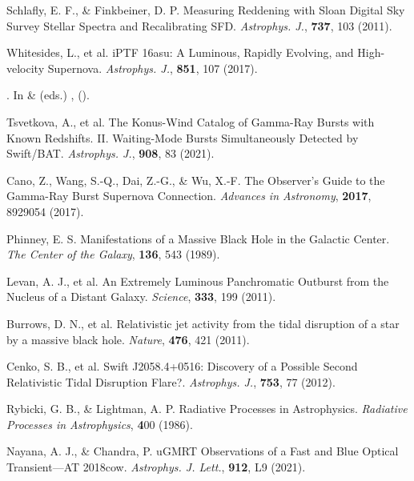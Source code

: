 \documentclass{nature_plusfigure}
\newcommand{\apj}{{Astrophys. J.}}
\newcommand{\apjl}{{Astrophys. J. Lett.}}
\newcommand{\nat}{{Nature}}
\begin{document}
\begin{methods}
\begin{thebibliography}{10}
  Schlafly, E. F., \& Finkbeiner, D. P. Measuring Reddening with Sloan Digital Sky Survey Stellar Spectra and Recalibrating SFD. \emph{\apj}, \textbf{737}, 103 (2011). 
 
  Whitesides, L., et al. iPTF 16asu: A Luminous, Rapidly Evolving, and High-velocity Supernova. \emph{\apj}, \textbf{851}, 107 (2017). 

\newblock {}.
\newblock In  \&  (eds.) \emph{},
   ().
 

 Tsvetkova, A., et al. The Konus-Wind Catalog of Gamma-Ray Bursts with Known Redshifts. II. Waiting-Mode Bursts Simultaneously Detected by Swift/BAT. \emph{\apj}, \textbf{908}, 83 (2021). 

 Cano, Z., Wang, S.-Q., Dai, Z.-G., \& Wu, X.-F. The Observer's Guide to the Gamma-Ray Burst Supernova Connection. \emph{Advances in Astronomy}, \textbf{2017}, 8929054 (2017). 
 
 
  Phinney, E. S. Manifestations of a Massive Black Hole in the Galactic Center. \emph{The Center of the Galaxy}, \textbf{136}, 543 (1989). 
 
  Levan, A. J., et al. An Extremely Luminous Panchromatic Outburst from the Nucleus of a Distant Galaxy. \emph{Science}, \textbf{333}, 199 (2011). 

  Burrows, D. N., et al. Relativistic jet activity from the tidal disruption of a star by a massive black hole. \emph{\nat}, \textbf{476}, 421 (2011). 

 Cenko, S. B., et al. Swift J2058.4+0516: Discovery of a Possible Second Relativistic Tidal Disruption Flare?. \emph{\apj}, \textbf{753}, 77 (2012). 


 Rybicki, G. B., \& Lightman, A. P. Radiative Processes in Astrophysics. \emph{Radiative Processes in Astrophysics}, \textbf 400 (1986). 

 Nayana, A. J., \& Chandra, P. uGMRT Observations of a Fast and Blue Optical Transient—AT 2018cow. \emph{\apjl}, \textbf{912}, L9 (2021). 


\end{thebibliography}
\end{methods}
\end{document}
